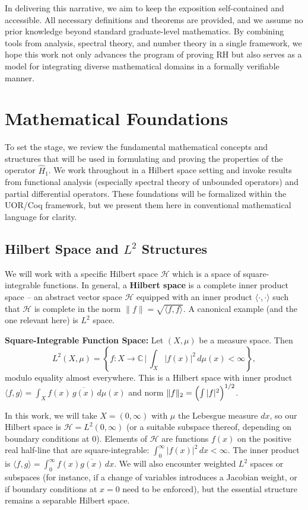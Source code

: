 \documentclass[12pt]{article}
\theoremstyle{plain}
\theoremstyle{definition}
\begin{document}
In delivering this narrative, we aim to keep the exposition self-contained and accessible. All necessary definitions and theorems are provided, and we assume no prior knowledge beyond standard graduate-level mathematics. By combining tools from analysis, spectral theory, and number theory in a single framework, we hope this work not only advances the program of proving RH but also serves as a model for integrating diverse mathematical domains in a formally verifiable manner.

\section{Mathematical Foundations}

To set the stage, we review the fundamental mathematical concepts and structures that will be used in formulating and proving the properties of the operator \(\hat{H}_1\). We work throughout in a Hilbert space setting and invoke results from functional analysis (especially spectral theory of unbounded operators) and partial differential operators. These foundations will be formalized within the UOR/Coq framework, but we present them here in conventional mathematical language for clarity.

\subsection{Hilbert Space and \(L^2\) Structures}

We will work with a specific Hilbert space \(\mathcal{H}\) which is a space of square-integrable functions. In general, a \textbf{Hilbert space} is a complete inner product space -- an abstract vector space \(\mathcal{H}\) equipped with an inner product \(\langle \cdot,\cdot \rangle\) such that \(\mathcal{H}\) is complete in the norm \(\|f\| = \sqrt{\langle f,f\rangle}\). A canonical example (and the one relevant here) is \(L^2\) space.

\textbf{Square-Integrable Function Space:} Let \((X,\mu)\) be a measure space. Then 
\[
L^2(X,\mu) = \left\{f: X \to \mathbb{C} \,\Big|\, \int_X |f(x)|^2\,d\mu(x) < \infty \right\},
\]
modulo equality almost everywhere. This is a Hilbert space with inner product \(\langle f,g\rangle = \int_X f(x)\,\overline{g(x)}\,d\mu(x)\) and norm \(\|f\|_2 = \Bigl(\int |f|^2\Bigr)^{1/2}\).

In this work, we will take \(X=(0,\infty)\) with \(\mu\) the Lebesgue measure \(dx\), so our Hilbert space is \(\mathcal{H} = L^2(0,\infty)\) (or a suitable subspace thereof, depending on boundary conditions at 0). Elements of \(\mathcal{H}\) are functions \(f(x)\) on the positive real half-line that are square-integrable: \(\int_0^\infty |f(x)|^2\,dx < \infty\). The inner product is \(\langle f,g\rangle = \int_0^\infty f(x)\overline{g(x)}\,dx\). We will also encounter weighted \(L^2\) spaces or subspaces (for instance, if a change of variables introduces a Jacobian weight, or if boundary conditions at \(x=0\) need to be enforced), but the essential structure remains a separable Hilbert space.
\end{document}
